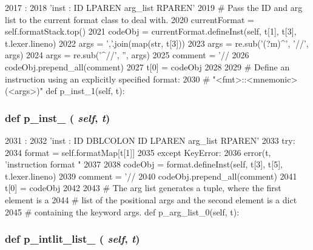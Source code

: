 \begin{DoxyCode}
2017                          :
2018         'inst : ID LPAREN arg_list RPAREN'
2019         # Pass the ID and arg list to the current format class to deal with.
2020         currentFormat = self.formatStack.top()
2021         codeObj = currentFormat.defineInst(self, t[1], t[3], t.lexer.lineno)
2022         args = ','.join(map(str, t[3]))
2023         args = re.sub('(?m)^', '//', args)
2024         args = re.sub('^//', '', args)
2025         comment = '\n// %
2026         codeObj.prepend_all(comment)
2027         t[0] = codeObj
2028 
2029     # Define an instruction using an explicitly specified format:
2030     # "<fmt>::<mnemonic>(<args>)"
    def p_inst_1(self, t):
\end{DoxyCode}
\hypertarget{classisa__parser_1_1ISAParser_ab3843884ee52e3b3cbd5bbfe89fe5573}{
\subsubsection[{p\_\-inst\_\-1}]{\setlength{\rightskip}{0pt plus 5cm}def p\_\-inst\_ ( {\em self}, \/   {\em t})}}
\label{classisa__parser_1_1ISAParser_ab3843884ee52e3b3cbd5bbfe89fe5573}



\begin{DoxyCode}
2031                          :
2032         'inst : ID DBLCOLON ID LPAREN arg_list RPAREN'
2033         try:
2034             format = self.formatMap[t[1]]
2035         except KeyError:
2036             error(t, 'instruction format "%
2037 
2038         codeObj = format.defineInst(self, t[3], t[5], t.lexer.lineno)
2039         comment = '\n// %
2040         codeObj.prepend_all(comment)
2041         t[0] = codeObj
2042 
2043     # The arg list generates a tuple, where the first element is a
2044     # list of the positional args and the second element is a dict
2045     # containing the keyword args.
    def p_arg_list_0(self, t):
\end{DoxyCode}
\hypertarget{classisa__parser_1_1ISAParser_abad174497eba2f447149c2daa703c869}{
\subsubsection[{p\_\-intlit\_\-list\_\-0}]{\setlength{\rightskip}{0pt plus 5cm}def p\_\-intlit\_\-list\_ ( {\em self}, \/   {\em t})}}
\label{classisa__parser_1_1ISAParser_abad174497eba2f447149c2daa703c869}




